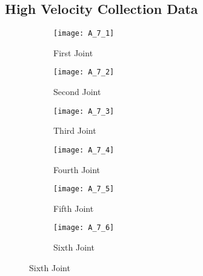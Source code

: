 \subsection*{High Velocity Collection Data}
\begin{figure}[H]
  \caption{Friction Identification}  
  \begin{subfigure}[t]{0.5\textwidth}
    \centering
    \texttt{[image: A\_7\_1]} 
    \caption{First Joint}
  \end{subfigure}
  \begin{subfigure}[t]{0.5\textwidth}
    \centering
    \texttt{[image: A\_7\_2]}
    \caption{Second Joint}
  \end{subfigure}
  \begin{subfigure}[t]{0.5\textwidth}
    \centering
    \texttt{[image: A\_7\_3]}
    \caption{Third Joint}
  \end{subfigure}
  \begin{subfigure}[t]{0.5\textwidth}
    \centering
    \texttt{[image: A\_7\_4]}
    \caption{Fourth Joint}
  \end{subfigure}
  \begin{subfigure}[t]{0.5\textwidth}
    \centering
    \texttt{[image: A\_7\_5]}
    \caption{Fifth Joint}
  \end{subfigure}
  \begin{subfigure}[t]{0.5\textwidth}
    \centering
    \texttt{[image: A\_7\_6]}
    \caption{Sixth Joint}
  \end{subfigure}
\end{figure}

